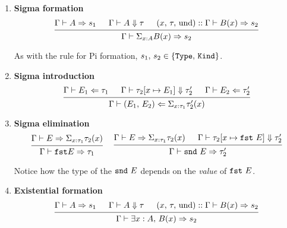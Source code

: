 \documentclass{article}
\begin{document}
\begin{enumerate}
\item \textbf{Sigma formation} \\
  \[
    \begin{prooftree}
      \hypo{\Gamma \vdash A \Rightarrow s_1}
      \hypo{\Gamma \vdash A \Downarrow \tau}
      \hypo{(x, \, \tau, \, \text{und}) :: \Gamma \vdash B(x) \Rightarrow s_2}
      \infer3{\Gamma \vdash \Sigma_{x : A}B(x) \Rightarrow s_2}
    \end{prooftree}
  \]

  As with the rule for Pi formation, $s_1, \, s_2 \in \{\texttt{Type}, \, \texttt{Kind}\}$.

\item \textbf{Sigma introduction} \\
  \[
    \begin{prooftree}
      \hypo{\Gamma \vdash E_1 \Leftarrow \tau_1}
      \hypo{\Gamma \vdash \tau_2[x \mapsto E_1] \Downarrow \tau_2'}
      \hypo{\Gamma \vdash E_2 \Leftarrow \tau_2'}
      \infer3{\Gamma \vdash (E_1, \, E_2) \Leftarrow 
        \Sigma_{x : \tau_1}\tau_2'(x)}
    \end{prooftree}
  \]
  
\item \textbf{Sigma elimination} \\
  \begin{gather*}
    \begin{prooftree}
      \hypo{\Gamma \vdash E \Rightarrow \Sigma_{x : \tau_1}\tau_2(x)}
      \infer1{\Gamma \vdash \fst E \Rightarrow \tau_1}
    \end{prooftree}
  ~ \quad
    \begin{prooftree}
      \hypo{\Gamma \vdash E \Rightarrow \Sigma_{x : \tau_1}\tau_2(x)}
      \hypo{\Gamma \vdash \tau_2[x \mapsto \fst \,\, E] \Downarrow \tau_2'}
      \infer2{\Gamma \vdash \snd \,\, E \Rightarrow \tau_2'}
    \end{prooftree}
  \end{gather*}

  Notice how the type of the $\texttt{snd} \,\, E$ depends on the \textit{value} of
  $\texttt{fst} \,\, E$.

\item \textbf{Existential formation} \\
\[
    \begin{prooftree}
      \hypo{\Gamma \vdash A \Rightarrow s_1}
      \hypo{\Gamma \vdash A \Downarrow \tau}
      \hypo{(x, \, \tau, \, \text{und}) :: \Gamma \vdash B(x) \Rightarrow s_2}
      \infer3{\Gamma \vdash \exists x : A, \, B(x) \Rightarrow s_2}
    \end{prooftree}
\]


\end{enumerate}
\end{document}

